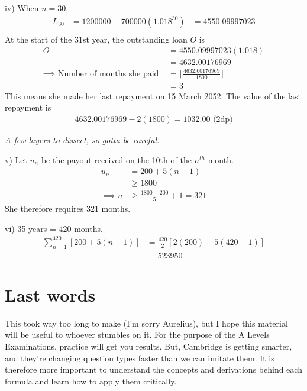 \documentclass[12pt, a4paper, titlepage]{article}
\begin{document}
iv)
When $n = 30$,
\begin{align*}
    L_{30} &= 1200000 - 700000(1.018^{30})
    &= 4550.09997023 \\
\end{align*}
At the start of the 31st year, the outstanding loan $O$ is
\begin{align*}
    O &= 4550.09997023(1.018) \\
    &= 4632.00176969 \\
    \implies \text{ Number of months she paid } &= \lceil \frac{4632.00176969}{1800} \rceil \\
    &= 3
\end{align*}
This means she made her last repayment on 15 March 2052. The value of the last repayment is
\begin{align*}
    4632.00176969 - 2(1800) = 1032.00 \text{ (2dp)}
\end{align*}

\emph{A few layers to dissect, so gotta be careful.}

v)
Let $u_n$ be the payout received on the 10th of the $n^{th}$ month.
\begin{align*}
    u_n &= 200 + 5(n - 1) \\
    &\ge 1800 \\
    \implies n &\ge \frac{1800 - 200}{5} + 1 = 321
\end{align*}
She therefore requires 321 months.

vi)
35 years = 420 months.
\begin{align*}
    \sum_{n = 1}^{420} [200 + 5(n - 1)] &= \frac{420}{2}[2(200) + 5(420 - 1)] \\
    &= 523950
\end{align*}

\section{Last words}
This took way too long to make (I'm sorry Aurelius), but I hope this material will be useful to whoever stumbles on it. For the purpose of the A Levels Examinations, practice will get you results. But, Cambridge is getting smarter, and they're changing question types faster than we can imitate them. It is therefore more important to understand the concepts and derivations behind each formula and learn how to apply them critically.
\end{document}
